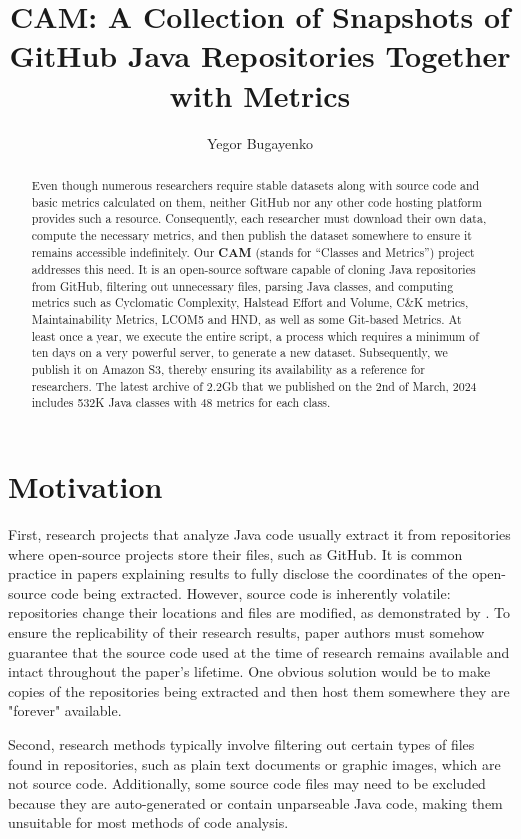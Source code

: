 \documentclass[11pt,sigplan,nonacm]{acmart}
\title{CAM: A Collection of Snapshots of GitHub Java Repositories Together with Metrics}
\author{Yegor Bugayenko}
\affiliation{\institution{Huawei, Russia, Moscow}\city{}\country{}}
\newcommand\cam{{\sffamily\bfseries CAM}}
\begin{document}
\begin{abstract}
Even though numerous researchers require stable data\-sets along with source code and basic metrics calculated on them, neither GitHub nor any other code hosting platform provides such a resource. Consequently, each researcher must download their own data, compute the necessary metrics, and then publish the dataset somewhere to ensure it remains accessible indefinitely. Our \cam{} (stands for ``Classes and Metrics'') project addresses this need. It is an open-source software capable of cloning Java repositories from GitHub, filtering out unnecessary files, parsing Java classes, and computing metrics such as Cyclomatic Complexity, Halstead Effort and Volume, C\&K metrics, Maintainability Metrics, LCOM5 and HND, as well as some Git-based Metrics. At least once a year, we execute the entire script, a process which requires a minimum of ten days on a very powerful server, to generate a new dataset. Subsequently, we publish it on Amazon S3, thereby ensuring its availability as a reference for researchers. The latest archive of 2.2Gb that we published on the 2nd of March, 2024 includes 532K Java classes with 48 metrics for each class.
\end{abstract}

\maketitle

\section{Motivation}

First, research projects that analyze Java code usually extract it from repositories where open-source projects store their files, such as GitHub. It is common practice in papers explaining results to fully disclose the coordinates of the open-source code being extracted. However, source code is inherently volatile: repositories change their locations and files are modified, as demonstrated by \citet{5463348}. To ensure the replicability of their research results, paper authors must somehow guarantee that the source code used at the time of research remains available and intact throughout the paper's lifetime. One obvious solution would be to make copies of the repositories being extracted and then host them somewhere they are "forever" available.

Second, research methods typically involve filtering out certain types of files found in repositories, such as plain text documents or graphic images, which are not source code. Additionally, some source code files may need to be excluded because they are auto-generated or contain unparseable Java code, making them unsuitable for most methods of code analysis.
\end{document}
